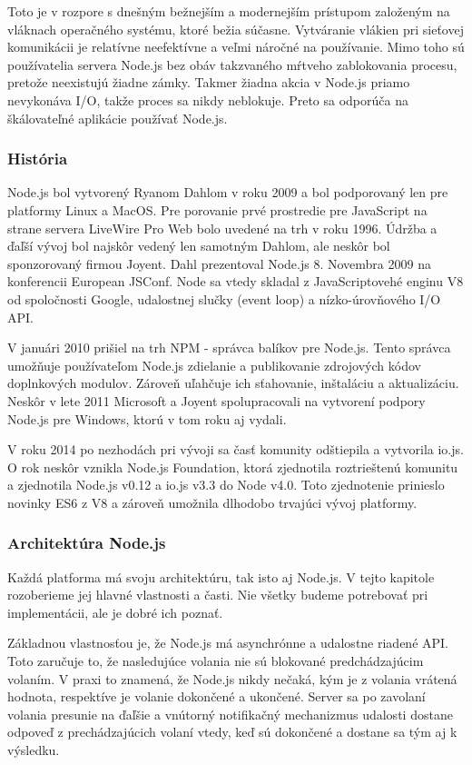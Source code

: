 \indent Toto je v rozpore s dnešným bežnejším a modernejším prístupom založeným na vláknach operačného systému, ktoré bežia súčasne. Vytváranie vlákien pri sieťovej komunikácii je relatívne neefektívne a veľmi náročné na používanie. Mimo toho sú používatelia servera Node.js bez obáv takzvaného mŕtveho zablokovania procesu, pretože neexistujú žiadne zámky. Takmer žiadna akcia v Node.js priamo nevykonáva I/O, takže proces sa nikdy neblokuje. Preto sa odporúča na škálovateľné aplikácie používať Node.js\cite{nodejs_1}.

\subsubsection{História}
\indent Node.js bol vytvorený Ryanom Dahlom v roku 2009 a bol podporovaný len pre platformy Linux a MacOS. Pre porovanie prvé prostredie pre JavaScript na strane servera LiveWire Pro Web bolo uvedené na trh v roku 1996. Údržba a ďaľší vývoj bol najskôr vedený len samotným Dahlom, ale neskôr bol sponzorovaný firmou Joyent. Dahl prezentoval Node.js 8. Novembra 2009 na konferencii European JSConf. Node sa vtedy skladal z JavaScriptovehé enginu V8 od spoločnosti Google, udalostnej slučky (event loop) a nízko-úrovňového I/O API.

\indent V januári 2010 prišiel na trh NPM - správca balíkov pre Node.js. Tento správca umožňuje používateľom Node.js zdielanie a publikovanie zdrojových kódov doplnkových modulov. Zároveň uľahčuje ich sťahovanie, inštaláciu a aktualizáciu. Neskôr v lete 2011 Microsoft a Joyent spolupracovali na vytvorení podpory Node.js pre Windows, ktorú v tom roku aj vydali. 

\indent V roku 2014 po nezhodách pri vývoji sa časť komunity odštiepila a vytvorila io.js. O rok neskôr vznikla Node.js Foundation, ktorá zjednotila roztrieštenú komunitu a zjednotila Node.js v0.12 a io.js v3.3 do Node v4.0. Toto zjednotenie prinieslo novinky ES6 z V8 a zároveň umožnila dlhodobo trvajúci vývoj platformy.

\subsubsection{Architektúra Node.js}
\indent Každá platforma má svoju architektúru, tak isto aj Node.js. V tejto kapitole rozoberieme jej hlavné vlastnosti a časti. Nie všetky budeme potrebovať pri implementácii, ale je dobré ich poznať.

\indent Základnou vlastnosťou je, že Node.js má asynchrónne a udalostne riadené API. Toto zaručuje to, že nasledujúce volania nie sú blokované predchádzajúcim volaním. V praxi to znamená, že Node.js nikdy nečaká, kým je z volania vrátená hodnota, respektíve je volanie dokončené a ukončené. Server sa po zavolaní volania presunie na ďaľšie a vnútorný notifikačný mechanizmus udalosti dostane odpoveď z prechádzajúcich volaní vtedy, keď sú dokončené a dostane sa tým aj k výsledku. 

